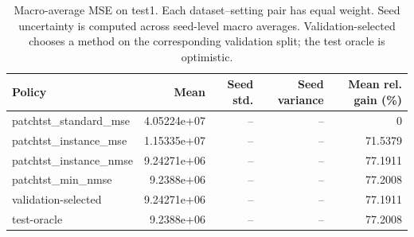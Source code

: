 \begin{table}[htbp]
\centering
\caption{Macro-average MSE on test1. Each dataset--setting pair has equal weight. Seed uncertainty is computed across seed-level macro averages. Validation-selected chooses a method on the corresponding validation split; the test oracle is optimistic.}
\begin{tabular}{lrrrr}
\toprule
Policy & Mean & Seed std. & Seed variance & Mean rel. gain (\%) \\
\midrule
patchtst\_standard\_mse & 4.05224e+07 & -- & -- & 0 \\
patchtst\_instance\_mse & 1.15335e+07 & -- & -- & 71.5379 \\
patchtst\_instance\_nmse & 9.24271e+06 & -- & -- & 77.1911 \\
patchtst\_min\_nmse & 9.2388e+06 & -- & -- & 77.2008 \\
validation-selected & 9.24271e+06 & -- & -- & 77.1911 \\
\midrule
test-oracle & 9.2388e+06 & -- & -- & 77.2008 \\
\bottomrule
\end{tabular}
\end{table}

